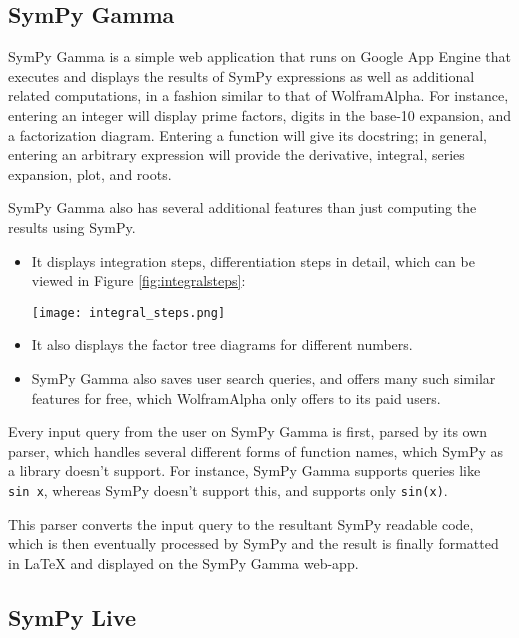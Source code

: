 \subsection{SymPy Gamma}\label{sympy-gamma}

SymPy Gamma is a simple web application that runs on Google App Engine 
that executes and displays the results of SymPy expressions as well as
additional related computations, in a fashion similar to that of
Wolfram\textbar{}Alpha. For instance, entering an integer will display
prime factors, digits in the base-10 expansion, and a factorization
diagram. Entering a function will give its docstring; in general,
entering an arbitrary expression will provide the derivative, integral,
series expansion, plot, and roots.

SymPy Gamma also has several additional features than just computing the
results using SymPy.

\begin{itemize}
\item
  It displays integration steps, differentiation steps in detail, which
  can be viewed in Figure \ref{fig:integralsteps}:\par
\begin{minipage}{\textwidth}
    \centering
    \texttt{[image: integral\_steps.png]}
    \label{fig:integralsteps}
\end{minipage}
\item
  It also displays the factor tree diagrams for different numbers.
\item
  SymPy Gamma also saves user search queries, and offers many such 
  similar features for free, which Wolfram\textbar{}Alpha only offers 
  to its paid users.
\end{itemize}
Every input query from the user on SymPy Gamma is first, parsed by its
own parser, which handles several different forms of function names,
which SymPy as a library doesn't support. For instance, SymPy Gamma
supports queries like \texttt{sin\ x}, whereas SymPy doesn't support
this, and supports only \texttt{sin(x)}.

This parser converts the input query to the resultant SymPy readable 
code, which is then eventually processed by SymPy and the result is 
finally formatted in LaTeX and displayed on the SymPy Gamma web-app.

\subsection{SymPy Live}\label{sympy-live}

